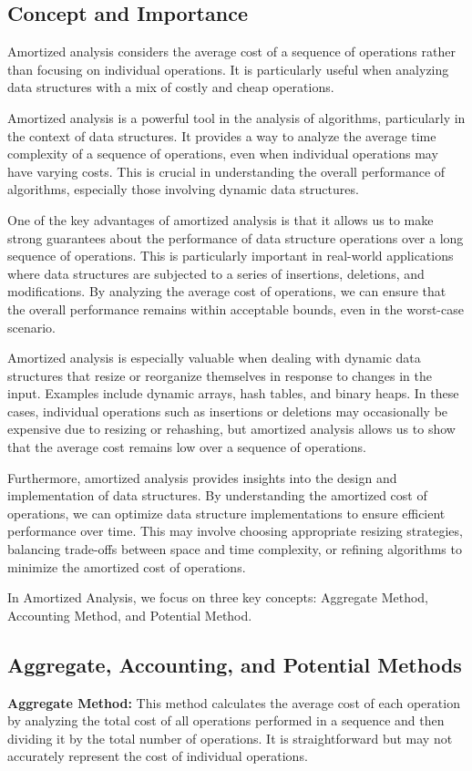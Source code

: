 \documentclass[12pt]{book} %
\begin{document}
\subsection{Concept and Importance}
Amortized analysis considers the average cost of a sequence of operations rather than focusing on individual operations. It is particularly useful when analyzing data structures with a mix of costly and cheap operations. 

Amortized analysis is a powerful tool in the analysis of algorithms, particularly in the context of data structures. It provides a way to analyze the average time complexity of a sequence of operations, even when individual operations may have varying costs. This is crucial in understanding the overall performance of algorithms, especially those involving dynamic data structures.

One of the key advantages of amortized analysis is that it allows us to make strong guarantees about the performance of data structure operations over a long sequence of operations. This is particularly important in real-world applications where data structures are subjected to a series of insertions, deletions, and modifications. By analyzing the average cost of operations, we can ensure that the overall performance remains within acceptable bounds, even in the worst-case scenario.

Amortized analysis is especially valuable when dealing with dynamic data structures that resize or reorganize themselves in response to changes in the input. Examples include dynamic arrays, hash tables, and binary heaps. In these cases, individual operations such as insertions or deletions may occasionally be expensive due to resizing or rehashing, but amortized analysis allows us to show that the average cost remains low over a sequence of operations.

Furthermore, amortized analysis provides insights into the design and implementation of data structures. By understanding the amortized cost of operations, we can optimize data structure implementations to ensure efficient performance over time. This may involve choosing appropriate resizing strategies, balancing trade-offs between space and time complexity, or refining algorithms to minimize the amortized cost of operations.

In Amortized Analysis, we focus on three key concepts: Aggregate Method, Accounting Method, and Potential Method.

\subsection{Aggregate, Accounting, and Potential Methods}
\textbf{Aggregate Method:} This method calculates the average cost of each operation by analyzing the total cost of all operations performed in a sequence and then dividing it by the total number of operations. It is straightforward but may not accurately represent the cost of individual operations.
\end{document}
